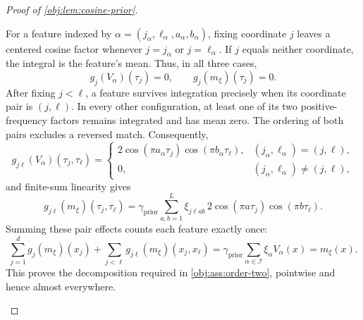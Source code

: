 \documentclass[11pt]{article}
\begin{document}
\begin{proof}[Proof of \cref{obj:lem:cosine-prior}]
\begin{enumerate}
For a feature indexed by
\(\alpha=(j_\alpha,\ell_\alpha,a_\alpha,b_\alpha)\), fixing coordinate \(j\)
leaves a centered cosine factor whenever \(j=j_\alpha\) or
\(j=\ell_\alpha\). If \(j\) equals neither coordinate, the integral is the
feature's mean. Thus, in all three cases,
\[
g_j(V_\alpha)(\tau_j)=0,
\qquad
g_j(m_\xi)(\tau_j)=0.
\]
After fixing \(j<\ell\), a feature survives integration precisely when its
coordinate pair is \((j,\ell)\). In every other configuration, at least one
of its two positive-frequency factors remains integrated and has mean
zero. The ordering of both pairs excludes a reversed match. Consequently,
\[
g_{j\ell}(V_\alpha)(\tau_j,\tau_\ell)
=
\begin{cases}
2\cos(\pi a_\alpha\tau_j)\cos(\pi b_\alpha\tau_\ell),
  &(j_\alpha,\ell_\alpha)=(j,\ell),\\
0,&(j_\alpha,\ell_\alpha)\ne(j,\ell),
\end{cases}
\]
and finite-sum linearity gives
\[
g_{j\ell}(m_\xi)(\tau_j,\tau_\ell)
=\gamma_{\mathrm{prior}}
  \sum_{a,b=1}^L\xi_{j\ell ab}
  \,2\cos(\pi a\tau_j)\cos(\pi b\tau_\ell).
\]
Summing these pair effects counts each feature exactly once:
\[
\sum_{j=1}^d g_j(m_\xi)(x_j)
+\sum_{j<\ell}g_{j\ell}(m_\xi)(x_j,x_\ell)
=\gamma_{\mathrm{prior}}
  \sum_{\alpha\in\mathcal I}\xi_\alpha V_\alpha(x)
=m_\xi(x).
\]
This proves the decomposition required in \cref{obj:ass:order-two},
pointwise and hence almost everywhere.


\end{enumerate}
\end{proof}
\end{document}
